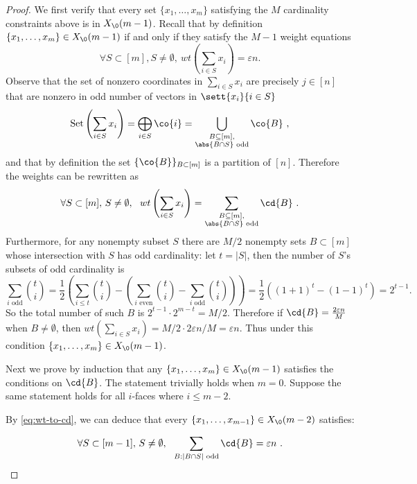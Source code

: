 \begin{proof}
    We first verify that every set $\{x_1,\dots,x_m\}$ satisfying the $M$ cardinality constraints above is in $X_\0(m-1)$. Recall that by definition $\{x_1,\dots,x_m\}\in X_\0(m-1)$ if and only if they satisfy the $M-1$ weight equations \[\forall S\subset[m], S\neq \emptyset,~wt\left(\sum_{i\in S} x_i\right) = \varepsilon n.\] Observe that the set of nonzero coordinates in $\sum_{i\in S} x_i$ are precisely $j\in[n]$ that are nonzero in odd number of vectors in $\sett{x_i}{i\in S}$
    \[\text{Set}\left(\sum_{i\in S} x_i\right) = \bigoplus_{i\in S} \co{i} = \bigcup_{\substack{B\subseteq [m], \\\abs{B\cap S}\text{ odd}}}\co{B}~,\]
    and that by definition the set $\{\co{B}\}_{B\subset [m]}$ is a partition of $[n]$. Therefore the weights can be rewritten as
    \begin{equation}\label{eq:wt-to-cd}
        \forall S\subset [m],\,S\neq \emptyset,~~  wt\left(\sum_{i\in S} x_i\right) = \sum_{\substack{B\subseteq [m], \\\abs{B\cap S}\text{ odd}}} \cd{B} ~.
    \end{equation}
    Furthermore, for any nonempty subset $S$ there are $M/2$ nonempty sets $B\subset [m]$ whose intersection with $S$ has odd cardinality: let $t = |S|$, then the number of  $S$'s subsets of odd cardinality is  \[\sum_{i\text{ odd}} \binom{t}{i} = \frac{1}{2}\left(\sum_{i\le t} \binom{t}{i} - \left(\sum_{i\text{ even}} \binom{t}{i} - \sum_{i\text{ odd}} \binom{t}{i}\right) \right) =  \frac{1}{2} ((1+1)^t-(1-1)^t) = 2^{t-1}.\] 
    So the total number of such $B$ is $2^{t-1}\cdot 2^{m-t} = M/2$.
    Therefore if $\cd{B}  = \frac{2\varepsilon n}{M}$ when $B\neq \emptyset$, then $wt(\sum_{i\in S} x_i) = M/2\cdot 2\varepsilon n/M =
 \varepsilon n$. Thus under this condition $\{x_1,\dots,x_m\}\in X_\0(m-1)$.
    
    Next we prove by induction that any $\{x_1,\dots,x_m\} \in X_\0(m-1)$ satisfies the conditions on $\cd{B}$. The statement trivially holds when $m = 0$. Suppose the same statement holds for all $i$-faces where $i\le m-2$. 

    By \eqref{eq:wt-to-cd}, we can deduce that every $\{x_1,\dots,x_{m-1}\} \in X_\0(m-2)$ satisfies:

    \begin{equation}\label{eq:m-2-constraint}
        \forall S\subset[m-1],\,S\neq \emptyset,~~ \sum_{B: |B\cap S| \text{ odd}} \cd{B}  = \varepsilon n ~.
    \end{equation}


\end{proof}
